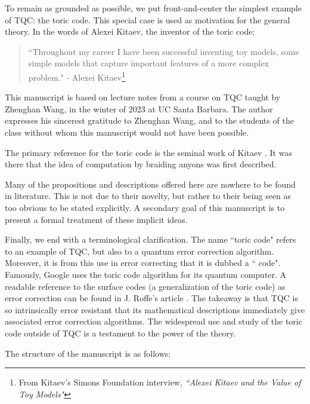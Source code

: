 \documentclass{article}
\theoremstyle{definition}
\numberwithin{figure}{section}
\begin{document}
To remain as grounded as possible, we put front-and-center the simplest example of TQC: the toric code. This special case is used as motivation for the general theory. In the words of Alexei Kitaev, the inventor of the toric code:

\begin{quote}
``Throughout my career I have been successful inventing toy models, some simple models that capture important features of a more complex problem." - Alexei Kitaev\footnote{From Kitaev's Simons Foundation interview, \textit{``Alexei Kitaev and the Value of Toy Models"}}
\end{quote}

This manuscript is based on lecture notes from a course on TQC taught by Zhenghan Wang, in the winter of 2023 at UC Santa Barbara. The author expresses his sincerest gratitude to Zhenghan Wang, and to the students of the class without whom this manuscript would not have been possible.

The primary reference for the toric code is the seminal work of Kitaev \cite{kitaev2003fault}. It was there that the idea of computation by braiding anyons was first described.

Many of the propositions and descriptions offered here are nowhere to be found in literature. This is not due to their novelty, but rather to their being seen as too obvious to be stated explicitly. A secondary goal of this manuscript is to present a formal treatment of these implicit ideas.

Finally, we end with a terminological clarification. The name ``toric code" refers to an example of TQC, but also to a quantum error correction algorithm. Moreover, it is from this use in error correcting that it is dubbed a `` code". Famously, Google uses the toric code algorithm for its quantum computer. A readable reference to the surface codes (a generalization of the toric code) as error correction can be found in J. Roffe's article \cite{roffe2019quantum}. The takeaway is that TQC is so intrinsically error resistant that its mathematical descriptions immediately give associated error correction algorithms. The widespread use and study of the toric code outside of TQC is a testament to the power of the theory.


The structure of the manuscript is as follows:
\end{document}
